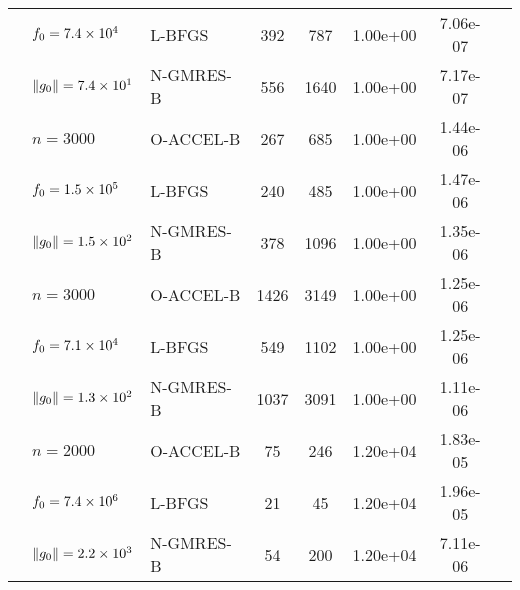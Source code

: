 \begin{tabular}{*{3}{l}*{2}{S[table-format=4]}
*{2}{S[table-format=-1.1e-2]}c}
 & $f_0 = \num{7.4e+04} $  & L-BFGS & 392 & 787 & 1.00e+00 & 7.06e-07 &  \\
 & ${\|g_0\|} = \num{7.4e+01} $  & N-GMRES-B & 556 & 1640 & 1.00e+00 & 7.17e-07 &  \\
\addlinespace
{} & $ n = \num{3000} $  & O-ACCEL-B & 267 & 685 & 1.00e+00 & 1.44e-06 &  \\
 & $f_0 = \num{1.5e+05} $  & L-BFGS & 240 & 485 & 1.00e+00 & 1.47e-06 &  \\
 & ${\|g_0\|} = \num{1.5e+02} $  & N-GMRES-B & 378 & 1096 & 1.00e+00 & 1.35e-06 &  \\
\addlinespace
{} & $ n = \num{3000} $  & O-ACCEL-B & 1426 & 3149 & 1.00e+00 & 1.25e-06 &  \\
 & $f_0 = \num{7.1e+04} $  & L-BFGS & 549 & 1102 & 1.00e+00 & 1.25e-06 &  \\
 & ${\|g_0\|} = \num{1.3e+02} $  & N-GMRES-B & 1037 & 3091 & 1.00e+00 & 1.11e-06 &  \\
\addlinespace
{} & $ n = \num{2000} $  & O-ACCEL-B & 75 & 246 & 1.20e+04 & 1.83e-05 &  \\
 & $f_0 = \num{7.4e+06} $  & L-BFGS & 21 & 45 & 1.20e+04 & 1.96e-05 &  \\
 & ${\|g_0\|} = \num{2.2e+03} $  & N-GMRES-B & 54 & 200 & 1.20e+04 & 7.11e-06 &  \\
\bottomrule
\end{tabular}

